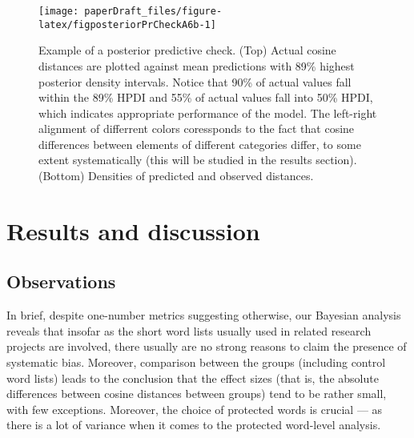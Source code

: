 \documentclass[
  12pt,
  dvipsnames,enabledeprecatedfontcommands]{scrartcl}
\begin{document}
\begin{figure}[H]

\begin{center}\texttt{[image: paperDraft\_files/figure-latex/figposteriorPrCheckA6b-1]} \end{center}
\caption{Example of a posterior predictive check. (Top) Actual cosine distances are plotted against mean predictions with 89\% highest posterior density intervals. Notice that 90\% of actual values fall within the 89\% HPDI and 55\% of actual values fall into 50\% HPDI, which indicates appropriate performance of the model. The left-right alignment of differrent colors coressponds to the fact that cosine differences between elements of different categories differ, to some extent systematically (this will be studied in the results section). (Bottom) Densities of predicted and observed distances.}
\label{fig:posteriorCheck1}
\end{figure}

\normalsize

\hypertarget{results-and-discussion}{%
\section{Results and discussion}\label{results-and-discussion}}

\label{sec:results}

\vspace{1mm}

\normalsize

\hypertarget{observations}{%
\subsection{Observations}\label{observations}}

\label{subsec:observations}

In brief, despite one-number metrics suggesting otherwise, our Bayesian
analysis reveals that insofar as the short word lists usually used in
related research projects are involved, there usually are no strong
reasons to claim the presence of systematic bias. Moreover, comparison
between the groups (including control word lists) leads to the
conclusion that the effect sizes (that is, the absolute differences
between cosine distances between groups) tend to be rather small, with
few exceptions. Moreover, the choice of protected words is crucial ---
as there is a lot of variance when it comes to the protected word-level
analysis.
\end{document}

